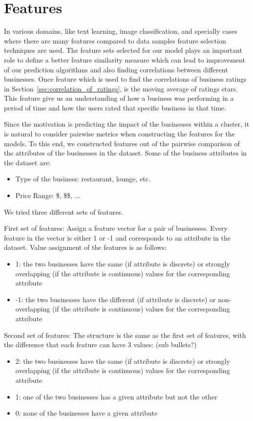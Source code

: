 \documentclass{vldb}
\begin{document}
\section{Features}
In various domains, like text learning, image classification, and specially cases where there are many features compared to data samples feature selection techniques are used. The feature sets selected for our model plays an important role to define a better feature similarity measure which can lead to improvement of our prediction algorithms and also finding correlations between different businesses.
Once feature which is used to find the correlations of business ratings in Section~\ref{sec:correlation_of_ratings}, is the moving average of ratings stars. This feature give us an understanding of how a business was performing in a period of time and how the users rated that specific business in that time.

Since the motivation is predicting the impact of the businesses within a cluster, it is natural to consider pairwise metrics when constructing the features for the models. To this end, we constructed features out of the pairwise comparison of the attributes of the businesses in the dataset. Some of the business attributes in the dataset are:
\begin{itemize}
  \item Type of the business: restaurant, lounge, etc.
  \item Price Range: \$, \$\$, ...
\end{itemize}

We tried three different sets of features.

First set of features: Assign a feature vector for a pair of businesses. Every feature in the vector is either 1 or -1 and corresponds to an attribute in the dataset. Value assignment of the features is as follows:
\begin{itemize}
\item 1: the two businesses have the same (if attribute is discrete) or strongly overlapping (if the attribute is continuous) values for the corresponding attribute
\item -1: the two businesses have the different (if attribute is discrete) or non-overlapping (if the attribute is continuous) values for the corresponding attribute
\end{itemize}

Second set of features: The structure is the same as the first set of features, with the difference that each feature can have 3 values:
(sub bullets?)
\begin{itemize}
\item 2: the two businesses have the same (if attribute is discrete) or strongly overlapping (if the attribute is continuous) values for the corresponding attribute
\item 1: one of the two businesses has a given attribute but not the other
\item 0: none of the businesses have a given attribute
\end{itemize}
\end{document}

